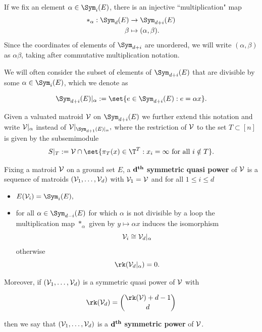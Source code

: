 If we fix an element $\alpha \in \Sym_i(E)$, there is an injective ``multiplication" map
    \begin{align*}
        *_\alpha: \Sym_d(E)&\to \Sym_{d+i}(E)\\
        \beta&\mapsto (\alpha,\beta).
    \end{align*}
Since the coordinates of elements of $\Sym_{d+i}$ are unordered, we will write $(\alpha,\beta)$ as $\alpha\beta$, taking after commutative multiplication notation. 

We will often consider the subset of elements of $\Sym_{d+i}(E)$ that are divisible by some $\alpha\in \Sym_{i}(E)$, which we denote as

$$\Sym_{d+i}(E)|_{\alpha} := \set{e\in \Sym_{d+i}(E): e= \alpha x}.$$

Given a valuated matroid $\mathcal{V}$ on $\Sym_{d+i}(E)$ we further extend this notation and write $\mathcal{V}|_{\alpha}$ instead of $\sV|_{\Sym_{d+1}(E)|_{\alpha}},$ where the restriction of $\mathcal{V}$ to the set $T\subset [n]$ is given by the subsemimodule 
$$S|_T:=\sV\cap \set{\pi_T(x)\in \T^T : x_i=\infty \text{ for all } i\notin T}.$$

\begin{definition}\label{def:introSymprod}
Fixing a matroid $\mathcal{V}$ on a ground set $E$, a $\mathbf{d}^{\text{\textbf{th}}}$ \textbf{symmetric quasi power} of $\mathcal{V}$ is a sequence of matroids $(\mathcal{V}_1,\dots,\mathcal{V}_d)$ with $\mathcal{V}_1 = \mathcal{V}$ and for all $1\leq i \leq d$
\begin{itemize}
    \item $E(\sV_i) = \Sym_i(E),$
    \item for all $\alpha\in \Sym_{d-i}(E)$ for which $\alpha$ is not divisible by a loop the multiplication map $*_\alpha$ given by $y\mapsto \alpha x$ induces the isomorphism
    \begin{equation} 
        \mathcal{V}_i\cong \mathcal{V}_d|_{\alpha}
    \end{equation}
    otherwise
    \begin{equation}
        \rk(\sV_d|_{\alpha})=0.
    \end{equation}
    
\end{itemize} 
Moreover, if $(\mathcal{V}_1,\dots,\mathcal{V}_d)$ is a symmetric quasi power of $\mathcal{V}$ with

\begin{equation}
\rk(\sV_d)= \binom{\rk(\sV)+d-1}{d}
\end{equation}

then we say that $(\mathcal{V}_1,\dots,\mathcal{V}_d)$ is a $\mathbf{d}^{\text{\textbf{th}}}$ \textbf{symmetric power} of $\mathcal{V}$.
\end{definition}

